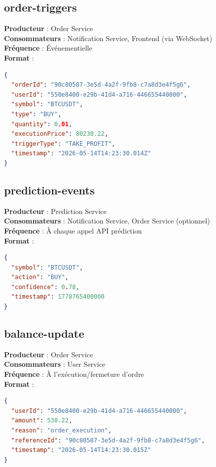 \documentclass[12pt,a4paper,twoside]{report}
\begin{document}
\subsection{order-triggers}
\textbf{Producteur} : Order Service \\
\textbf{Consommateurs} : Notification Service, Frontend (via WebSocket) \\
\textbf{Fréquence} : Événementielle \\
\textbf{Format} :

\begin{lstlisting}[language=json]
{
  "orderId": "90c80587-3e5d-4a2f-9fb8-c7a8d3e4f5g6",
  "userId": "550e8400-e29b-41d4-a716-446655440000",
  "symbol": "BTCUSDT",
  "type": "BUY",
  "quantity": 0.01,
  "executionPrice": 80230.22,
  "triggerType": "TAKE_PROFIT",
  "timestamp": "2026-05-14T14:23:30.014Z"
}
\end{lstlisting}

\subsection{prediction-events}
\textbf{Producteur} : Prediction Service \\
\textbf{Consommateurs} : Notification Service, Order Service (optionnel) \\
\textbf{Fréquence} : À chaque appel API prédiction \\
\textbf{Format} :

\begin{lstlisting}[language=json]
{
  "symbol": "BTCUSDT",
  "action": "BUY",
  "confidence": 0.78,
  "timestamp": 1778765400000
}
\end{lstlisting}

\subsection{balance-update}
\textbf{Producteur} : Order Service \\
\textbf{Consommateurs} : User Service \\
\textbf{Fréquence} : À l'exécution/fermeture d'ordre \\
\textbf{Format} :

\begin{lstlisting}[language=json]
{
  "userId": "550e8400-e29b-41d4-a716-446655440000",
  "amount": 530.22,
  "reason": "order_execution",
  "referenceId": "90c80587-3e5d-4a2f-9fb8-c7a8d3e4f5g6",
  "timestamp": "2026-05-14T14:23:30.015Z"
}
\end{lstlisting}
\end{document}
